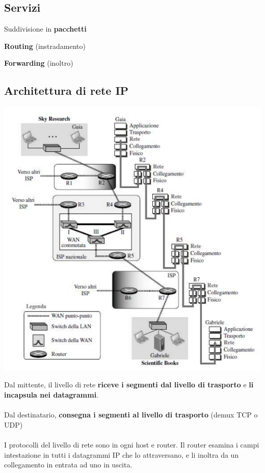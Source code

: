 \documentclass[10pt]{article}
\begin{document}
\subsection{Servizi}
\begin{list}{}{}
\item Suddivisione in \textbf{pacchetti}
\item \textbf{Routing} (instradamento)
\item \textbf{Forwarding} (inoltro)
\end{list}
\subsection{Architettura di rete IP}
\begin{multicols}{2}
\includegraphics[scale=0.65]{livelloretearch.png}
\columnbreak

Dal mittente, il livello di rete \textbf{riceve i segmenti dal livello di trasporto} e \textbf{li incapsula nei datagrammi}.\\\\
Dal destinatario, \textbf{consegna i segmenti al livello di trasporto} (demux TCP o UDP)\\\\
I protocolli del livello di rete sono in ogni host e router. Il router esamina i campi intestazione in tutti i datagrammi IP che lo attraversano, e li inoltra da un collegamento in entrata ad uno in uscita.
\end{multicols}
\pagebreak
\end{document}

